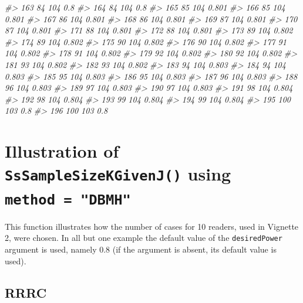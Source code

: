 \documentclass[]{book}
\newenvironment{Shaded}{\begin{snugshade}}{\end{snugshade}}
\newcommand{\CommentTok}[1]{\textcolor[rgb]{0.56,0.35,0.01}{\textit{#1}}}
\begin{document}
\begin{Shaded}
\begin{Highlighting}[]
\CommentTok{#> 163         84      104   0.8}
\CommentTok{#> 164         84      104   0.8}
\CommentTok{#> 165         85      104 0.801}
\CommentTok{#> 166         85      104 0.801}
\CommentTok{#> 167         86      104 0.801}
\CommentTok{#> 168         86      104 0.801}
\CommentTok{#> 169         87      104 0.801}
\CommentTok{#> 170         87      104 0.801}
\CommentTok{#> 171         88      104 0.801}
\CommentTok{#> 172         88      104 0.801}
\CommentTok{#> 173         89      104 0.802}
\CommentTok{#> 174         89      104 0.802}
\CommentTok{#> 175         90      104 0.802}
\CommentTok{#> 176         90      104 0.802}
\CommentTok{#> 177         91      104 0.802}
\CommentTok{#> 178         91      104 0.802}
\CommentTok{#> 179         92      104 0.802}
\CommentTok{#> 180         92      104 0.802}
\CommentTok{#> 181         93      104 0.802}
\CommentTok{#> 182         93      104 0.802}
\CommentTok{#> 183         94      104 0.803}
\CommentTok{#> 184         94      104 0.803}
\CommentTok{#> 185         95      104 0.803}
\CommentTok{#> 186         95      104 0.803}
\CommentTok{#> 187         96      104 0.803}
\CommentTok{#> 188         96      104 0.803}
\CommentTok{#> 189         97      104 0.803}
\CommentTok{#> 190         97      104 0.803}
\CommentTok{#> 191         98      104 0.804}
\CommentTok{#> 192         98      104 0.804}
\CommentTok{#> 193         99      104 0.804}
\CommentTok{#> 194         99      104 0.804}
\CommentTok{#> 195        100      103   0.8}
\CommentTok{#> 196        100      103   0.8}
\end{Highlighting}
\end{Shaded}

\hypertarget{illustration-of-sssamplesizekgivenj-using-method-dbmh}{%
\section{\texorpdfstring{Illustration of \texttt{SsSampleSizeKGivenJ()} using \texttt{method\ =\ "DBMH"}}{Illustration of SsSampleSizeKGivenJ() using method = "DBMH"}}\label{illustration-of-sssamplesizekgivenj-using-method-dbmh}}

This function illustrates how the number of cases for 10 readers, used in Vignette 2, were chosen. In all but one example the default value of the \texttt{desiredPower} argument is used, namely 0.8 (if the argument is absent, its default value is used).

\hypertarget{rrrc}{%
\subsection{RRRC}\label{rrrc}}
\end{document}

